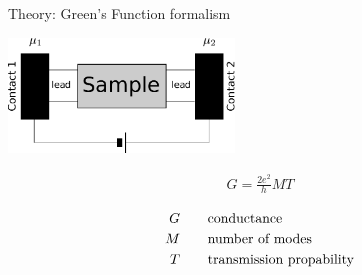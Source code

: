 \documentclass{beamer}
\begin{document}
\begin{frame}{Theory: Green's Function formalism}
    \begin{multicols}{2}
        \includegraphics[width=6cm]{sample-leads}

        \begin{align*}
            G = \frac{2 e^2}{h} MT
        \end{align*}

        \begin{align*}
            G \qquad& \textnormal{conductance}\\
            M \qquad& \textnormal{number of modes}\\
            T \qquad& \textnormal{transmission propability}
        \end{align*}
    \end{multicols}
\end{frame}
\end{document}
